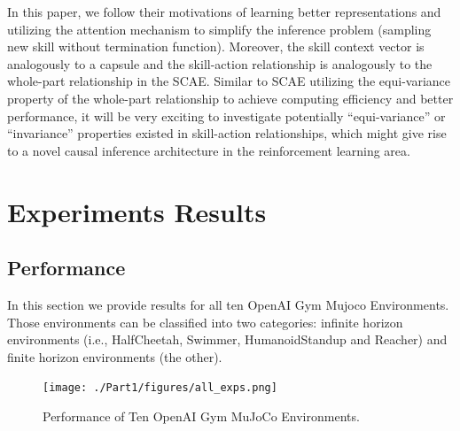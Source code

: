 In this paper, we follow their motivations of learning better
representations and utilizing the attention mechanism to simplify
the inference problem (sampling new skill without termination
function). Moreover, the skill context vector is analogously to a
capsule and the skill-action relationship is analogously to the
whole-part relationship in the SCAE. Similar to SCAE utilizing
the equi-variance property of the whole-part relationship to
achieve computing efficiency and better performance, it will be
very exciting to investigate potentially ``equi-variance'' or
``invariance'' properties existed in skill-action relationships,
which might give rise to a novel causal inference architecture in
the reinforcement learning area.

\section{Experiments Results}
\label{sec:append_exp}
\subsection{Performance}
\label{sec:append_exp_perf}

In this section we provide results for all ten OpenAI Gym Mujoco
Environments. Those environments can be classified into two categories:
infinite horizon environments (i.e., HalfCheetah, Swimmer,
HumanoidStandup and Reacher) and finite horizon environments (the
other).
\begin{figure}[thb]
  \centering
  \texttt{[image: ./Part1/figures/all\_exps.png]}\\
  \caption{\label{fig:all_tasks} Performance of Ten OpenAI Gym
    MuJoCo Environments.}
\end{figure}

